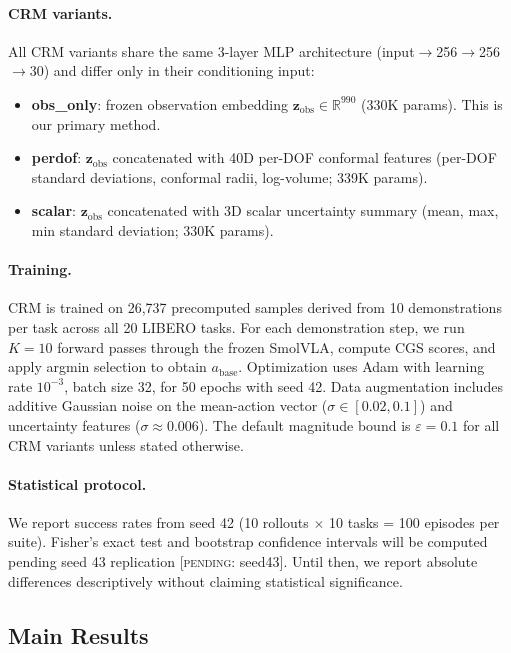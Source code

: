 \paragraph{CRM variants.}
All CRM variants share the same 3-layer MLP architecture (input$\to$256$\to$256$\to$30) and differ only in their conditioning input:
\begin{itemize}[nosep]
  \item \textbf{obs\_only}: frozen observation embedding $\mathbf{z}_{\mathrm{obs}} \in \mathbb{R}^{990}$ (330K params). This is our primary method.
  \item \textbf{perdof}: $\mathbf{z}_{\mathrm{obs}}$ concatenated with 40D per-DOF conformal features (per-DOF standard deviations, conformal radii, log-volume; 339K params).
  \item \textbf{scalar}: $\mathbf{z}_{\mathrm{obs}}$ concatenated with 3D scalar uncertainty summary (mean, max, min standard deviation; 330K params).
\end{itemize}

\paragraph{Training.}
CRM is trained on 26{,}737 precomputed samples derived from 10 demonstrations per task across all 20 LIBERO tasks.
For each demonstration step, we run $K{=}10$ forward passes through the frozen SmolVLA, compute CGS scores, and apply argmin selection to obtain $a_{\mathrm{base}}$.
Optimization uses Adam with learning rate $10^{-3}$, batch size 32, for 50 epochs with seed 42.
Data augmentation includes additive Gaussian noise on the mean-action vector ($\sigma \in [0.02, 0.1]$) and uncertainty features ($\sigma \approx 0.006$).
The default magnitude bound is $\varepsilon = 0.1$ for all CRM variants unless stated otherwise.

\paragraph{Statistical protocol.}
We report success rates from seed 42 (10 rollouts $\times$ 10 tasks = 100 episodes per suite).
Fisher's exact test and bootstrap confidence intervals will be computed pending seed 43 replication [\textsc{pending}: seed43].
Until then, we report absolute differences descriptively without claiming statistical significance.


\subsection{Main Results}
\label{sec:main_results}

